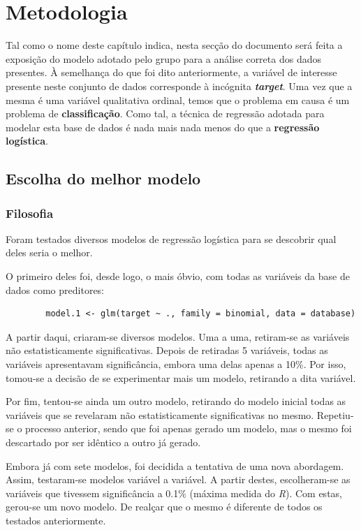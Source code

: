 \documentclass[a4paper]{report}
\begin{document}
\chapter{Metodologia}
\large{
	Tal como o nome deste capítulo indica, nesta secção do documento será feita a exposição do modelo adotado pelo grupo para a análise correta dos dados presentes. À semelhança do que foi dito 
	anteriormente, a variável de interesse presente neste conjunto de dados corresponde à incógnita \textit{\textbf{target}}. Uma vez que a mesma é uma variável qualitativa ordinal, temos que o 
	problema em causa é um problema de \textbf{classificação}. Como tal, a técnica de regressão adotada para modelar esta base de dados é nada mais nada menos do que a \textbf{regressão logística}.

	\section{Escolha do melhor modelo}
	\subsection{Filosofia}

	Foram testados diversos modelos de regressão logística para se descobrir qual deles seria o melhor.
	
	O primeiro deles foi, desde logo, o mais óbvio, com todas as variáveis da base de dados como preditores:

	\begin{verbatim}
	    model.1 <- glm(target ~ ., family = binomial, data = database)
	\end{verbatim}

	A partir daqui, criaram-se diversos modelos. Uma a uma, retiram-se as variáveis não estatisticamente significativas.
	Depois de retiradas 5 variáveis, todas as variáveis apresentavam significância, embora uma delas apenas a 10\%.
	Por isso, tomou-se a decisão de se experimentar mais um modelo, retirando a dita variável.
	
	Por fim, tentou-se ainda um outro modelo, retirando do modelo inicial todas as variáveis que se revelaram não estatisticamente significativas no mesmo.
	Repetiu-se o processo anterior, sendo que foi apenas gerado um modelo, mas o mesmo foi descartado por ser idêntico a outro já gerado.

	Embora já com sete modelos, foi decidida a tentativa de uma nova abordagem. 
	Assim, testaram-se modelos variável a variável. A partir destes, escolheram-se as variáveis que tivessem significância a 0.1\% (máxima medida do \textit{R}).
	Com estas, gerou-se um novo modelo. De realçar que o mesmo é diferente de todos os testados anteriormente.

}
\end{document}
